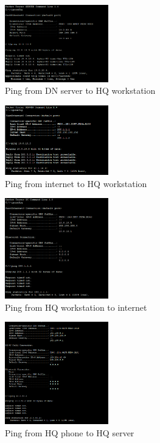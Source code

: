 \begin{figure}[H]
  \centering
  \includegraphics[width=0.4\textwidth]{./assets/ping.dns-hqw.png}
  \caption{Ping from DN server to HQ workstation}
\end{figure}

\begin{figure}[H]
  \centering
  \includegraphics[width=0.4\textwidth]{./assets/ping.web-hqw.png}
  \caption{Ping from internet to HQ workstation}
\end{figure}

\begin{figure}[H]
  \centering
  \includegraphics[width=0.4\textwidth]{./assets/ping.hqw-web.png}
  \caption{Ping from HQ workstation to internet}
\end{figure}

\begin{figure}[H]
  \centering
  \includegraphics[width=0.4\textwidth]{./assets/ping.hqp-hqs.png}
  \caption{Ping from HQ phone to HQ server}
\end{figure}

